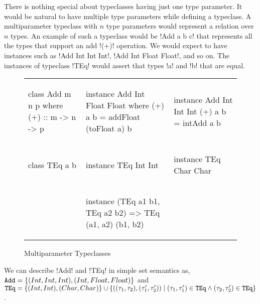 \documentclass[format=acmsmall,manuscript,review,screen,nonacm,margin=1in,11pt]{acmart}
\begin{document}
There is nothing special about typeclasses having just one type parameter. 
It would be natural to have multiple type parameters while defining a typeclass.
A multiparameter typeclass with $n$ type parameters would represent a relation over $n$ types.
An example of such a typeclass would be !Add a b c! that represents
all the types that support an add !(+)! operation. We would expect to have instances such as !Add Int Int Int!, 
!Add Int Float Float!, and so on. The instances of typeclass !TEq! would assert that types !a! and !b! that are equal.
\begin{figure}[ht]
  \footnotesize
  \begin{tabular}{l l l}
\begin{code}
class Add m n p where
  (+) :: m -> n -> p
\end{code}&%
\begin{code}
instance Add Int Float Float where
  (+) a b = addFloat (toFloat a) b
\end{code}&%
\begin{code}
instance Add Int Int Int
  (+) a b = intAdd a b
\end{code}\\
\begin{code}
class TEq a b
\end{code}&%
\begin{code}
instance TEq Int Int
\end{code}&%
\begin{code}
instance TEq Char Char
\end{code}\\
          &
\begin{code}
instance (TEq a1 b1, TEq a2 b2)
  => TEq (a1, a2) (b1, b2)
\end{code}
          &                
  \end{tabular}
  \caption{Multiparameter Typeclasses}
  \label{fig:multip-typeclass}
\end{figure}
We can describe !Add! and !TEq! in simple set semantics as, $\texttt{Add} = \{(Int, Int, Int), (Int, Float, Float)\}$
and $\texttt{TEq} = \{(Int, Int),(Char, Char)\} \cup \{((\tau_1, \tau_2) , (\tau'_1,\tau'_2)) \mid (\tau_1, \tau'_1)\in \texttt{TEq} \land (\tau_2, \tau'_2)\in \texttt{TEq}\}$.
\end{document}
